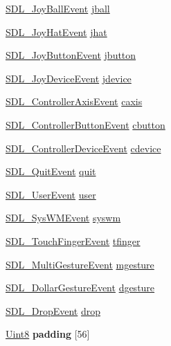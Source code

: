 \begin{DoxyCompactItemize}
\item 
\hyperlink{structSDL__JoyBallEvent}{S\+D\+L\+\_\+\+Joy\+Ball\+Event} \hyperlink{unionSDL__Event_ae433f511e3383d17f8fe02df745ee8f8}{jball}
\item 
\hyperlink{structSDL__JoyHatEvent}{S\+D\+L\+\_\+\+Joy\+Hat\+Event} \hyperlink{unionSDL__Event_a421b40e0f8e01f181c8d5548cff1dd1d}{jhat}
\item 
\hyperlink{structSDL__JoyButtonEvent}{S\+D\+L\+\_\+\+Joy\+Button\+Event} \hyperlink{unionSDL__Event_a591104d64903ae1cf70874fb5d3124ff}{jbutton}
\item 
\hyperlink{structSDL__JoyDeviceEvent}{S\+D\+L\+\_\+\+Joy\+Device\+Event} \hyperlink{unionSDL__Event_a17514dc19a846ea1b5fbe44123700c4c}{jdevice}
\item 
\hyperlink{structSDL__ControllerAxisEvent}{S\+D\+L\+\_\+\+Controller\+Axis\+Event} \hyperlink{unionSDL__Event_aa8f6df0f2716fae56204b12ab4a4c289}{caxis}
\item 
\hyperlink{structSDL__ControllerButtonEvent}{S\+D\+L\+\_\+\+Controller\+Button\+Event} \hyperlink{unionSDL__Event_aee2b5671c8dcdb447023715cc21593cb}{cbutton}
\item 
\hyperlink{structSDL__ControllerDeviceEvent}{S\+D\+L\+\_\+\+Controller\+Device\+Event} \hyperlink{unionSDL__Event_ad3beed01e690b885728e0b0e1d636378}{cdevice}
\item 
\hyperlink{structSDL__QuitEvent}{S\+D\+L\+\_\+\+Quit\+Event} \hyperlink{unionSDL__Event_a102a3008afe67a1c02ae7504e232dcef}{quit}
\item 
\hyperlink{structSDL__UserEvent}{S\+D\+L\+\_\+\+User\+Event} \hyperlink{unionSDL__Event_ab7c394e3ce7bf1e4f8d68bc0e9f1b042}{user}
\item 
\hyperlink{structSDL__SysWMEvent}{S\+D\+L\+\_\+\+Sys\+W\+M\+Event} \hyperlink{unionSDL__Event_ab3b2eaf5348d4c50a51b1f297fdef537}{syswm}
\item 
\hyperlink{structSDL__TouchFingerEvent}{S\+D\+L\+\_\+\+Touch\+Finger\+Event} \hyperlink{unionSDL__Event_ab18d7d60794cb056948ffa58541bc3c5}{tfinger}
\item 
\hyperlink{structSDL__MultiGestureEvent}{S\+D\+L\+\_\+\+Multi\+Gesture\+Event} \hyperlink{unionSDL__Event_ac19b3c6a6b5181a51eb4fbe2cbe726a9}{mgesture}
\item 
\hyperlink{structSDL__DollarGestureEvent}{S\+D\+L\+\_\+\+Dollar\+Gesture\+Event} \hyperlink{unionSDL__Event_a4481167b9f8549aeb254e97ca812e74d}{dgesture}
\item 
\hyperlink{structSDL__DropEvent}{S\+D\+L\+\_\+\+Drop\+Event} \hyperlink{unionSDL__Event_acff77bccbca65abbb876360a3f5209c9}{drop}
\item 
\hypertarget{unionSDL__Event_aabb599570edfa54aad6255c1f24f2ad2}{}\hyperlink{SDL__stdinc_8h_a2944638813a090aa23e62f4da842c3e2}{Uint8} {\bfseries padding} \mbox{[}56\mbox{]}\label{unionSDL__Event_aabb599570edfa54aad6255c1f24f2ad2}

\end{DoxyCompactItemize}


